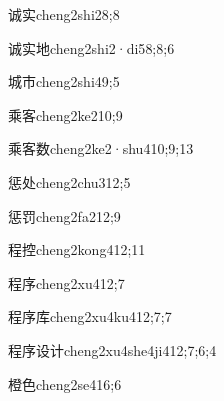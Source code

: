 \begin{verbete}{诚实}{cheng2shi2}{8;8}
\end{verbete}

\begin{verbete}{诚实地}{cheng2shi2·di5}{8;8;6}
\end{verbete}

\begin{verbete}{城市}{cheng2shi4}{9;5}
\end{verbete}

\begin{verbete}{乘客}{cheng2ke2}{10;9}
\end{verbete}

\begin{verbete}{乘客数}{cheng2ke2·shu4}{10;9;13}
\end{verbete}

\begin{verbete}{惩处}{cheng2chu3}{12;5}
\end{verbete}

\begin{verbete}{惩罚}{cheng2fa2}{12;9}
\end{verbete}

\begin{verbete}{程控}{cheng2kong4}{12;11}
\end{verbete}

\begin{verbete}{程序}{cheng2xu4}{12;7}
\end{verbete}

\begin{verbete}{程序库}{cheng2xu4ku4}{12;7;7}
\end{verbete}

\begin{verbete}{程序设计}{cheng2xu4she4ji4}{12;7;6;4}
\end{verbete}

\begin{verbete}{橙色}{cheng2se4}{16;6}
\end{verbete}

